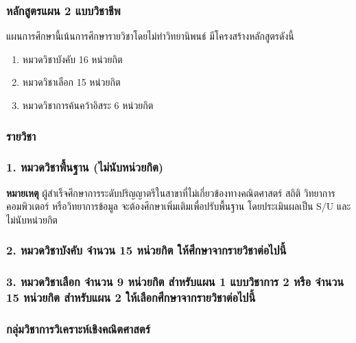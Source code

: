 \subsubsection*{หลักสูตรแผน 2 แบบวิชาชีพ} 
แผนการศึกษานี้เน้นการศึกษารายวิชาโดยไม่ทำวิทยานิพนธ์ มีโครงสร้างหลักสูตรดังนี้

\begin{enumerate}
	\item หมวดวิชาบังคับ \hfill 16 หน่วยกิต
	\item หมวดวิชาเลือก \hfill 15 หน่วยกิต
	\item หมวดวิชาการค้นคว้าอิสระ \hfill 6 หน่วยกิต
\end{enumerate}

\clearpage
\subsubsection{รายวิชา}

\subsubsection*{1. หมวดวิชาพื้นฐาน (ไม่นับหน่วยกิต)}



\par\noindent\textbf{หมายเหตุ} ผู้สำเร็จศึกษาการระดับปริญญาตรีในสาขาที่ไม่เกี่ยวข้องทางคณิตศาสตร์ สถิติ วิทยาการคอมพิวเตอร์ หรือวิทยาการข้อมูล จะต้องศึกษาเพิ่มเติมเพื่อปรับพื้นฐาน โดยประเมินผลเป็น S/U และไม่นับหน่วยกิต


\subsubsection*{2. หมวดวิชาบังคับ จำนวน 15 หน่วยกิต ให้ศึกษาจากรายวิชาต่อไปนี้}



\subsubsection*{3. หมวดวิชาเลือก จำนวน 9 หน่วยกิต สำหรับแผน 1 แบบวิชาการ 2 หรือ จำนวน 15 หน่วยกิต สำหรับแผน 2 ให้เลือกศึกษาจากรายวิชาต่อไปนี้}

\subsubsection*{กลุ่มวิชาการวิเคราะห์เชิงคณิตศาสตร์}



